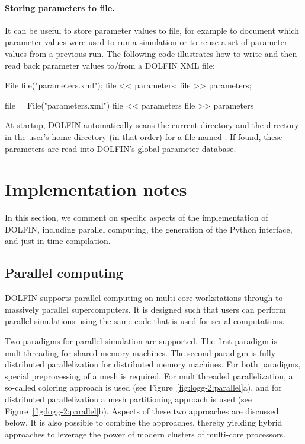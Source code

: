 \paragraph{Storing parameters to file.}

It can be useful to store parameter values to file, for example to
document which parameter values were used to run a simulation or to
reuse a set of parameter values from a previous run. The following code
illustrates how to write and then read back parameter values to/from a
DOLFIN XML file:
\begin{c++}
File file("parameters.xml");
file << parameters;
file >> parameters;
\end{c++}
\begin{python}
file = File("parameters.xml")
file << parameters
file >> parameters
\end{python}
At startup, DOLFIN automatically scans the current directory and the
directory  in the user's home directory (in that
order) for a file named . If found, these
parameters are read into DOLFIN's global parameter database.

\section{Implementation notes}
\label{sec:logg-2:implementation}

In this section, we comment on specific aspects of the implementation
of DOLFIN, including parallel computing, the generation of the Python
interface, and just-in-time compilation.

\subsection{Parallel computing}

DOLFIN supports parallel computing on multi-core workstations through
to massively parallel supercomputers. It is designed such that users
can perform parallel simulations using the same code that is used for
serial computations.

Two paradigms for parallel simulation are supported.  The first
paradigm is multithreading for shared memory machines.  The second
paradigm is fully distributed parallelization for distributed memory
machines. For both paradigms, special preprocessing of a mesh is
required.  For multithreaded parallelization, a so-called coloring
approach is used (see Figure~\ref{fig:logg-2:parallel}a), and for
distributed parallelization a mesh partitioning approach is used (see
Figure~\ref{fig:logg-2:parallel}b). Aspects of these two approaches are
discussed below. It is also possible to combine the approaches, thereby
yielding hybrid approaches to leverage the power of modern clusters of
multi-core processors.

